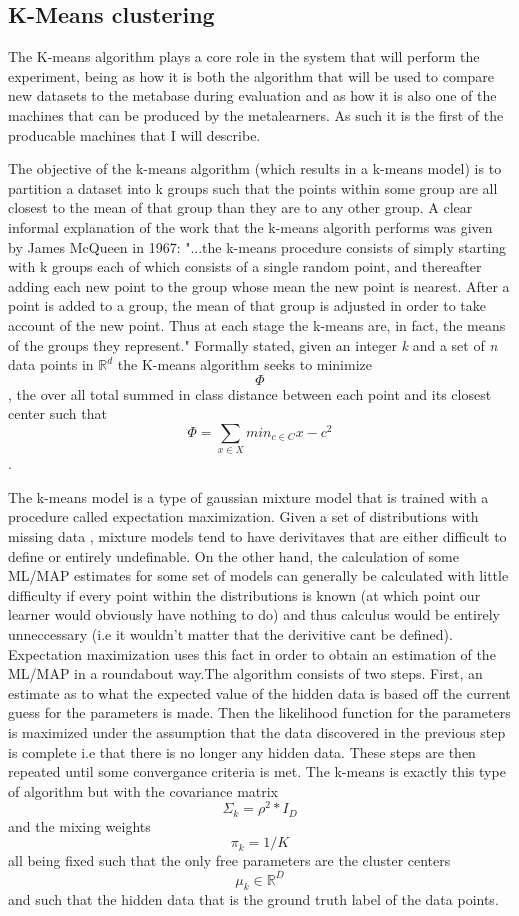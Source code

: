 \documentclass[a4paper,11pt]{article}
\begin{document}
  \subsection{K-Means clustering}
  The K-means algorithm plays a core role in the system that will perform the experiment, being as how
  it is both the algorithm that will be used to compare new datasets to the metabase during evaluation
  and as how it is also one of the machines that can be produced by the metalearners. As such it is the
  first of the producable machines that I will describe.

The objective of the k-means algorithm (which results in a k-means model) is to partition
a dataset into k groups such that the points within some group are all closest to
the mean of that group than they are to any other group. A clear
informal explanation of the work that the k-means algorith performs
was given by James McQueen in 1967: "...the k-means procedure
consists of simply starting with k groups each of which consists of a
single random point, and thereafter adding each new point to the
group whose mean the new point is nearest. After a point is added to
a group, the mean of that group is adjusted in order to take account
of the new point. Thus at each stage the k-means are, in fact, the
means of the groups they represent."\cite{McQueen} Formally stated,
given an integer \textit{k} and a set of \textit{n} data points in
$\mathbb{R}^{d}$ the K-means algorithm seeks to minimize $$\Phi$$, the
over all total summed in class distance between each point and its
closest center such that $$\Phi = \sum_{x \in X} min_{c \in C}\left. x-c \right.^{2} $$
\cite{Arthur}.

The k-means model is a type of gaussian mixture model that is trained with a procedure
called expectation maximization. Given a set of distributions with missing data
, mixture models tend to have derivitaves that are either difficult to define
or entirely undefinable. On the other hand, the calculation of some ML/MAP
estimates for some set of models can generally be calculated with little
difficulty if every point within the distributions is known (at which point our
learner would obviously have nothing to do) and thus calculus would be entirely
unneccessary (i.e it wouldn't matter that the derivitive cant be defined).
Expectation maximization uses this fact in order to obtain an estimation of the
ML/MAP in a roundabout way.The algorithm consists of two steps. First, an estimate as
to what the expected value of the hidden data is based off the current guess for the
parameters is made. Then the likelihood function for the parameters is maximized under
the assumption that the data discovered in the previous step is complete i.e that there
is no longer any hidden data. These steps are then repeated until some convergance criteria
is met. The k-means is exactly this type of algorithm but with the covariance matrix
$$\Sigma_{k} = \rho^{2}*I_{D}$$ and the mixing weights $$\pi_{k} = 1/K$$ all being fixed such
that the only free parameters are the cluster centers $$\mu_{k} \in \mathbb{R}^{D}$$
and such that the hidden data that is the ground truth label of the data points.
\end{document}
